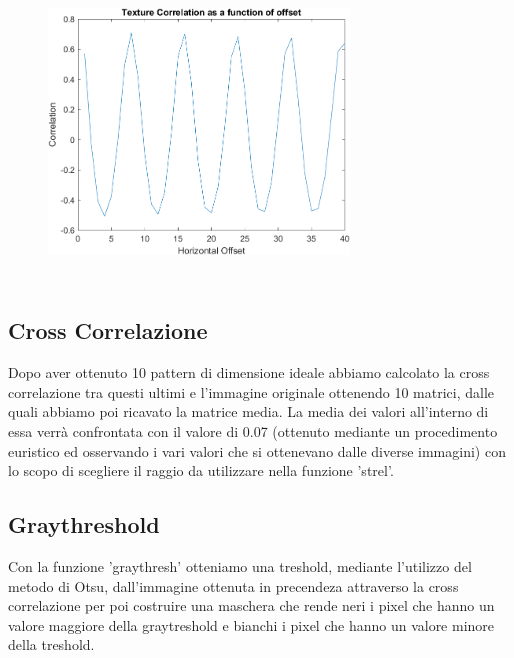 \documentclass[a4paper]{article}
\begin{document}
    \begin{figure}[H]
        \centering
        \includegraphics[width=8cm,height=8cm,keepaspectratio]{Grafico_massimi_ESI.png}
    \end{figure}
    
   \vspace{0.5cm}
   
    \subsection{Cross Correlazione}
    
    \setlength{\baselineskip}{0.8cm}
    {\vspace{0.5cm}\fontsize{6mm}{6mm}\selectfont Dopo aver ottenuto 10 pattern di dimensione ideale abbiamo calcolato la cross correlazione tra questi ultimi e l'immagine originale ottenendo 10 matrici, dalle quali abbiamo poi ricavato la matrice media. La media dei valori all'interno di essa verrà confrontata con il valore di 0.07 (ottenuto mediante un procedimento euristico ed osservando i vari valori che si ottenevano dalle diverse immagini) con lo scopo di scegliere il raggio da utilizzare nella funzione 'strel'. }
    

    \subsection{Graythreshold}
    
    
    \setlength{\baselineskip}{0.8cm}
    {\vspace{0.5cm}\fontsize{6mm}{6mm}\selectfont Con la funzione 'graythresh' otteniamo una treshold, mediante l'utilizzo del metodo di Otsu, dall'immagine ottenuta in precendeza attraverso la cross correlazione per poi costruire una maschera che rende neri i pixel che hanno un valore maggiore della graytreshold e bianchi i pixel che hanno un valore minore della treshold.  }
    
\end{document}
